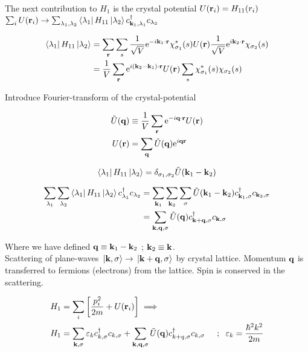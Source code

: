\noindent The next contribution to $H_1$ is the crystal potential $U(\vb{r}_i)= H_{11}(r_i)$\\
$ \sum_i U(\vb{r}_i) \rightarrow \sum_{\lambda_{1}, \lambda_{2}} \bra{\lambda_{1}}H_{11} \ket{\lambda_{2}} c^{\dagger}_{ \vb{k}_1, \lambda_1} c_{\lambda_{2}}$

\begin{align}
	\bra{\lambda_{1}} H_{11} \ket{\lambda_{2}} &= \sum_{\vb{r}} \sum_s \frac{1}{\sqrt{V}} \mathrm{e}^{-i \vb{k}_1\cdot \vb{r}} \chi_{\sigma_1}^*(s) U(\vb{r}) \frac{1}{\sqrt{V}} \mathrm{e}^{i \vb{k}_2 \cdot \vb{r}} \chi_{\sigma_2}(s)\\
	&= \frac{1}{V} \sum_{\vb{r}} \mathrm{e}^{i (\vb{k}_2-\vb{k}_1) \cdot \vb{r}} U(\vb{r}) \sum_s \chi_{\sigma_1}^* (s) \chi_{\sigma_2}(s) \nonumber 
\end{align}

\noindent Introduce Fourier-transform of the crystal-potential

\begin{align}
	\tilde{U}(\vb{q}) &\equiv \frac{1}{V} \sum_{\vb{r}} \mathrm{e}^{-i \vb{q}\cdot \vb{r}} U(\vb{r})\\
	U(\vb{r}) &= \sum_{\vb{q}} \tilde{U}(\vb{q}) \mathrm{e}^{i \vb{q} \vb{r}}
\end{align}

\begin{equation}
	\bra{\lambda_{1}} H_{11} \ket{\lambda_{2}}= \delta_{\sigma_1,\sigma_2} \tilde{U}(\vb{k}_1-\vb{k}_2)
\end{equation}


\begin{align}
	\sum_{\lambda_{1}} \sum_{\lambda_{2}} 	\bra{\lambda_{1}} H_{11} \ket{\lambda_{2}} c^{\dagger}_{\lambda_1} c_{\lambda_{2}} &= \sum_{\vb{k}_1} \sum_{\vb{k}_2} \sum_{\sigma} \tilde{U}(\vb{k}_1-\vb{k}_2) c^{\dagger}_{ \vb{k}_1, \sigma} c_{\vb{k}_2, \sigma} \nonumber \\
	&= \sum_{\vb{k}, \vb{q}, \sigma} \tilde{U} (\vb{q}) c^{\dagger}_{ \vb{k}+\vb{q}, \sigma} c_{\vb{k}, \sigma} \nonumber
\end{align}

\noindent Where we have defined $\vb{q} \equiv \vb{k}_1- \vb{k}_2$ ; $\vb{k}_2 \equiv \vb{k}$.\\
\linebreak
\noindent Scattering of plane-waves $\ket*{\vb{k}, \sigma} \rightarrow \ket*{\vb{k}+\vb{q}, \sigma}$ by crystal lattice. Momentum $\vb{q}$ is transferred to fermions (electrons) from the lattice. Spin is conserved in the scattering. 

\begin{align}
	H_1 &= \sum_i \left[ \frac{p_i^2}{2m}+U(\vb{r}_i) \right] \implies \\
	H_1 &= \sum_{\vb{k}, \sigma} \varepsilon_k c^{\dagger}_{k, \sigma} c_{k, \sigma} +\sum_{\vb{k},\vb{q}, \sigma} \tilde{U}(\vb{q})  c^{\dagger}_{ k+q, \sigma} c_{k,\sigma} \hspace{0.5cm} ; \hspace{0.2cm} \varepsilon_k= \frac{\hbar^2 k^2}{2m}
\end{align}


